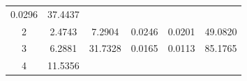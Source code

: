 \documentclass[11pt,]{article}
\begin{document}
\begin{longtable}[]{@{}cccccc@{}}
\begin{minipage}[t]{0.14\columnwidth}
0.0296\strut
\end{minipage} & \begin{minipage}[t]{0.13\columnwidth}\centering\strut
37.4437\strut
\end{minipage}\tabularnewline
\begin{minipage}[t]{0.08\columnwidth}\centering\strut
2\strut
\end{minipage} & \begin{minipage}[t]{0.11\columnwidth}\centering\strut
2.4743\strut
\end{minipage} & \begin{minipage}[t]{0.25\columnwidth}\centering\strut
7.2904\strut
\end{minipage} & \begin{minipage}[t]{0.11\columnwidth}\centering\strut
0.0246\strut
\end{minipage} & \begin{minipage}[t]{0.14\columnwidth}\centering\strut
0.0201\strut
\end{minipage} & \begin{minipage}[t]{0.13\columnwidth}\centering\strut
49.0820\strut
\end{minipage}\tabularnewline
\begin{minipage}[t]{0.08\columnwidth}\centering\strut
3\strut
\end{minipage} & \begin{minipage}[t]{0.11\columnwidth}\centering\strut
6.2881\strut
\end{minipage} & \begin{minipage}[t]{0.25\columnwidth}\centering\strut
31.7328\strut
\end{minipage} & \begin{minipage}[t]{0.11\columnwidth}\centering\strut
0.0165\strut
\end{minipage} & \begin{minipage}[t]{0.14\columnwidth}\centering\strut
0.0113\strut
\end{minipage} & \begin{minipage}[t]{0.13\columnwidth}\centering\strut
85.1765\strut
\end{minipage}\tabularnewline
\begin{minipage}[t]{0.08\columnwidth}\centering\strut
4\strut
\end{minipage} & \begin{minipage}[t]{0.11\columnwidth}\centering\strut
11.5356\strut
\end{minipage} & \begin{minipage}[t]{0.25\columnwidth}\centering\strut

\end{minipage}
\end{longtable}
\end{document}

